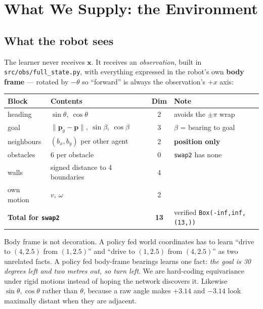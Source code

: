 \documentclass[11pt,a4paper]{article}
\newcommand{\code}[1]{\texttt{\small #1}}
\newcommand{\bx}{\mathbf{x}}
\newcommand{\bp}{\mathbf{p}}
\begin{document}
\section{What We Supply: the Environment}
\label{sec:env}

\subsection{What the robot sees}

The learner never receives $\bx$. It receives an \emph{observation}, built in
\code{src/obs/full\_state.py}, with everything expressed in the robot's own \textbf{body
frame} --- rotated by $-\theta$ so ``forward'' is always the observation's $+x$ axis:

\begin{center}
\small
\begin{tabular}{llcl}
\toprule
\textbf{Block} & \textbf{Contents} & \textbf{Dim} & \textbf{Note} \\
\midrule
heading    & $\sin\theta,\ \cos\theta$                       & 2 & avoids the $\pm\pi$ wrap \\
goal       & $\|\bp_g-\bp\|,\ \sin\beta,\ \cos\beta$         & 3 & $\beta$ = bearing to goal \\
neighbours & $(b_x, b_y)$ per other agent                    & 2 & \textbf{position only} \\
obstacles  & 6 per obstacle                                  & 0 & \code{swap2} has none \\
walls      & signed distance to 4 boundaries                 & 4 & \\
own motion & $v,\ \omega$                                    & 2 & \\
\midrule
\multicolumn{2}{l}{\textbf{Total for \code{swap2}}} & \textbf{13} & verified \code{Box(-inf,inf,(13,))} \\
\bottomrule
\end{tabular}
\end{center}

Body frame is not decoration. A policy fed world coordinates has to learn ``drive to
$(4,2.5)$ from $(1,2.5)$'' and ``drive to $(1,2.5)$ from $(4,2.5)$'' as two unrelated facts.
A policy fed body-frame bearings learns one fact: \emph{the goal is 30 degrees left and two
metres out, so turn left}. We are hard-coding equivariance under rigid motions instead of
hoping the network discovers it. Likewise $\sin\theta,\cos\theta$ rather than $\theta$,
because a raw angle makes $+3.14$ and $-3.14$ look maximally distant when they are adjacent.
\end{document}
